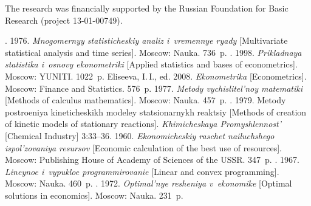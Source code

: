 



\Ack
\noindent
The research was financially supported by the Russian Foundation for
Basic Research (project 13-01-00749).





  \begin{multicols}{2}

\renewcommand{\bibname}{\protect\rmfamily References}



{\small\frenchspacing
 {%
 \begin{thebibliography}{99}
. 1976. \textit{Mnogomernyy statisticheskiy
analiz i~vremennye ryady} [Multivariate statistical analysis and time series].
Moscow: Nauka. 736~p.
. 1998. \textit{Prikladnaya statistika
i~osnovy ekonometriki} [Applied statistics and bases of econometrics]. Moscow:
YUNITI. 1022~p.
Eliseeva, I.\,I., ed. 2008.
\textit{Ekonometrika} [Econometrics].  Moscow: Finance and
Statistics. 576~p.
 1977. \textit{Metody vychislitel'noy matematiki} [Methods of
calculus mathematics]. Moscow: Nauka. 457~p.
. 1979. Metody
postroeniya kineticheskikh modeley sta\-tsi\-o\-nar\-nykh reaktsiy [Methods of creation of
kinetic models of stationary reactions].  \textit{Khimicheskaya Promyshlennost'}
[Chemical Industry] 3:33--36.
 1960. \textit{Ekonomicheskiy raschet nailuchshego
ispol'zovaniya resursov} [Economic calculation of the best use of resources].
Moscow: Publishing House of Academy of Sciences of the USSR. 347~p.
. 1967. \textit{Lineynoe i~vypukloe
programmirovanie} [Linear and convex programming]. Moscow: Nauka. 460~p.
. 1972. \textit{Optimal'nye resheniya
v~ekonomike} [Optimal solutions in economics]. Moscow: Nauka. 231~p.

\end{thebibliography}}}
\end{multicols}
